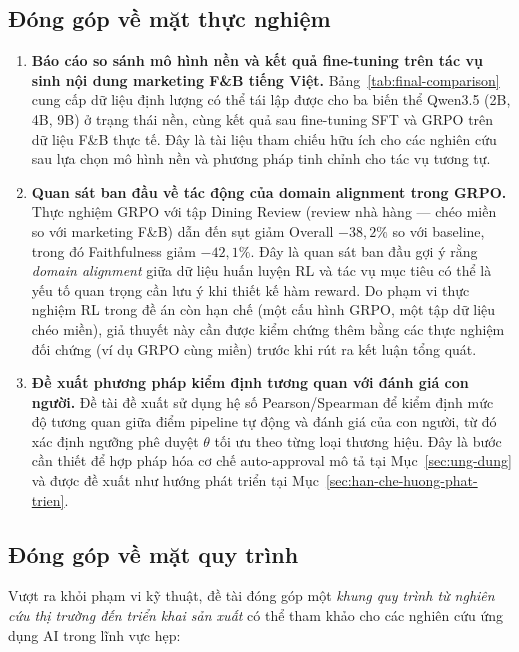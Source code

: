 \subsection{Đóng góp về mặt thực nghiệm}

\begin{enumerate}
  \item \textbf{Báo cáo so sánh mô hình nền và kết quả fine-tuning trên
    tác vụ sinh nội dung marketing F\&B tiếng Việt.}
    Bảng~\ref{tab:final-comparison} cung cấp dữ liệu định lượng có thể
    tái lập được cho ba biến thể Qwen3.5 (2B, 4B, 9B) ở trạng thái nền,
    cùng kết quả sau fine-tuning SFT và GRPO trên dữ liệu F\&B thực tế.
    Đây là tài liệu tham chiếu hữu ích cho các nghiên cứu sau lựa chọn
    mô hình nền và phương pháp tinh chỉnh cho tác vụ tương tự.
  \item \textbf{Quan sát ban đầu về tác động của domain alignment trong
    GRPO.} Thực nghiệm GRPO với tập Dining Review (review nhà hàng ---
    chéo miền so với marketing F\&B) dẫn đến sụt giảm Overall $-38{,}2\%$
    so với baseline, trong đó Faithfulness giảm $-42{,}1\%$. Đây là quan
    sát ban đầu gợi ý rằng \emph{domain alignment} giữa dữ liệu huấn
    luyện RL và tác vụ mục tiêu có thể là yếu tố quan trọng cần lưu ý
    khi thiết kế hàm reward. Do phạm vi thực nghiệm RL trong đề án
    còn hạn chế (một cấu hình GRPO, một tập dữ liệu chéo miền), giả
    thuyết này cần được kiểm chứng thêm bằng các thực nghiệm đối chứng
    (ví dụ GRPO cùng miền) trước khi rút ra kết luận tổng quát.
  \item \textbf{Đề xuất phương pháp kiểm định tương quan với đánh giá
    con người.} Đề tài đề xuất sử dụng hệ số Pearson/Spearman để kiểm
    định mức độ tương quan giữa điểm pipeline tự động và đánh giá của
    con người, từ đó xác định ngưỡng phê duyệt $\theta$ tối ưu theo
    từng loại thương hiệu. Đây là bước cần thiết để hợp pháp hóa cơ
    chế auto-approval mô tả tại Mục~\ref{sec:ung-dung} và được đề xuất
    như hướng phát triển tại Mục~\ref{sec:han-che-huong-phat-trien}.
\end{enumerate}

\subsection{Đóng góp về mặt quy trình}

Vượt ra khỏi phạm vi kỹ thuật, đề tài đóng góp một \emph{khung quy
trình từ nghiên cứu thị trường đến triển khai sản xuất} có thể tham
khảo cho các nghiên cứu ứng dụng AI trong lĩnh vực hẹp:

